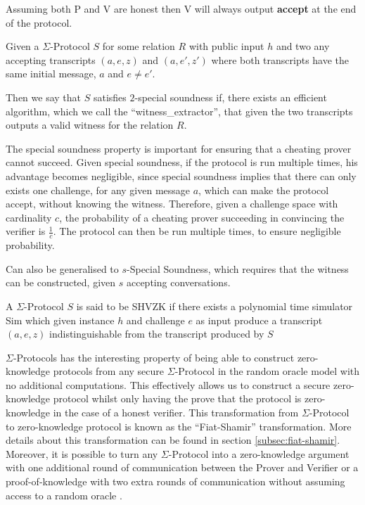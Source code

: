 \begin{definition}[Completeness]
  Assuming both P and V are honest then V will always output \textbf{accept} at
  the end of the protocol.
\end{definition}

\begin{definition}
Given a $\Sigma$-Protocol $S$ for some relation $R$ with public input $h$
and two any accepting transcripts $(a,e,z)$ and $(a,e',z')$
where both transcripts have the same initial message, $a$ and $e \neq e'$.

Then we say that $S$ satisfies $2$-special soundness if, there exists an
efficient algorithm, which we call the ``witness\_extractor'',
that given the two transcripts outputs a valid witness for the relation $R$.
\end{definition}

The special soundness property is important for ensuring that a cheating prover
cannot succeed. Given special soundness, if the protocol is run multiple times,
his advantage becomes negligible, since special soundness implies that there can
only exists one challenge, for any given message $a$, which can make the
protocol accept, without knowing the witness. Therefore, given a challenge space
with cardinality $c$, the probability of a cheating prover succeeding in
convincing the verifier is $\frac{1}{c}$. The protocol can then be run multiple
times, to ensure negligible probability.

Can also be generalised to $s$-Special Soundness, which requires that the
witness can be constructed, given $s$ accepting conversations.

\begin{definition}[SHVZK]
  A $\Sigma$-Protocol $S$ is said to be SHVZK if there exists a polynomial time
  simulator Sim which given instance $h$ and challenge $e$ as input produce a
  transcript $(a,e,z)$ indistinguishable from the transcript produced by $S$
\end{definition}

$\Sigma$-Protocols has the interesting property of being able to construct
zero-knowledge protocols from any secure $\Sigma$-Protocol in the random oracle
model with no additional computations. This effectively allows us to construct a
secure zero-knowledge protocol whilst only having the prove that the protocol is
zero-knowledge in the case of a honest verifier. This transformation from
$\Sigma$-Protocol to zero-knowledge protocol is known as the ``Fiat-Shamir''
transformation. More details about this transformation can be found in section
\ref{subsec:fiat-shamir}.
Moreover, it is possible to turn any $\Sigma$-Protocol into a zero-knowledge
argument with one additional round of communication between the Prover and
Verifier or a proof-of-knowledge with two extra rounds of communication without
assuming access to a random oracle \cite{on-sigma-protocols}.


